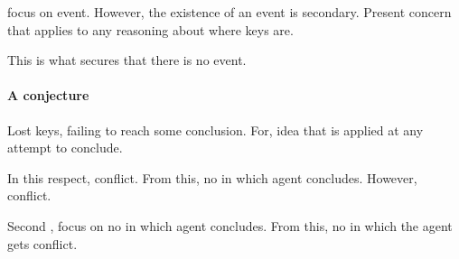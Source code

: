 \begin{note}
   focus on event.
  However, the existence of an event is secondary.
  Present concern that applies to any reasoning about where keys are.

  This is what secures that there is no event.
\end{note}

\paragraph{A conjecture}

\begin{note}
  Lost keys, failing to reach some conclusion.
  For, idea that is applied at any attempt to conclude.

  In this respect, conflict.
  From this, no \pevent{} in which agent concludes.
  However, conflict.

  Second , focus on no  in which agent concludes.
  From this, no \pevent{} in which the agent gets conflict.
\end{note}

